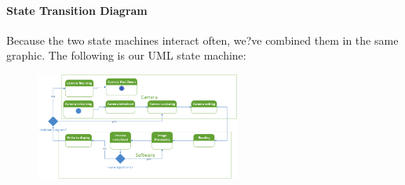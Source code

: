 	\paragraph{State Transition Diagram}
	Because the two state machines interact often, we?ve combined them in the same graphic. The following is our UML state machine:\\
	\begin{figure}[!ht] %
		\centering
		\includegraphics[width=0.6\textwidth,natwidth=610,natheight=642]{images/StateTransition_Diagram.png}  
		\end{figure}


